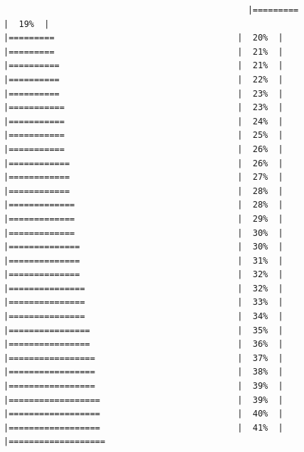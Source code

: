 \documentclass[
  krantz2]{krantz}
\begin{document}
\begin{verbatim}
                                                |=========                                    |  19%  |                                                     |=========                                    |  20%  |                                                     |=========                                    |  21%  |                                                     |==========                                   |  21%  |                                                     |==========                                   |  22%  |                                                     |==========                                   |  23%  |                                                     |===========                                  |  23%  |                                                     |===========                                  |  24%  |                                                     |===========                                  |  25%  |                                                     |===========                                  |  26%  |                                                     |============                                 |  26%  |                                                     |============                                 |  27%  |                                                     |============                                 |  28%  |                                                     |=============                                |  28%  |                                                     |=============                                |  29%  |                                                     |=============                                |  30%  |                                                     |==============                               |  30%  |                                                     |==============                               |  31%  |                                                     |==============                               |  32%  |                                                     |===============                              |  32%  |                                                     |===============                              |  33%  |                                                     |===============                              |  34%  |                                                     |================                             |  35%  |                                                     |================                             |  36%  |                                                     |=================                            |  37%  |                                                     |=================                            |  38%  |                                                     |=================                            |  39%  |                                                     |==================                           |  39%  |                                                     |==================                           |  40%  |                                                     |==================                           |  41%  |                                                     |===================           
\end{verbatim}
\end{document}
